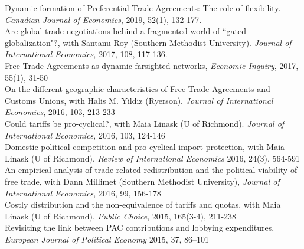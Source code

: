 \documentclass[11pt]{res}
\begin{document}
\begin{resume}
{Dynamic formation of Preferential Trade Agreements: The role of flexibility}. \emph{Canadian Journal of Economics}, 2019, 52(1), 132-177. \vspace{1.5mm}\\
{Are global trade negotiations behind a fragmented world of ``gated globalization"?}, with Santanu Roy (Southern Methodist University). \emph{Journal of International Economics}, 2017, 108, 117-136.\vspace{1.5mm}\\
{ Free Trade Agreements as dynamic farsighted networks}, \emph{Economic Inquiry}, 2017, 55(1), 31-50\vspace{1.5mm}\\
{On the different geographic characteristics of Free Trade Agreements and Customs Unions}, with Halis M. Yildiz (Ryerson). \emph{Journal of International Economics}, 2016, 103, 213-233 \vspace{1.5mm}\\
{Could tariffs be pro-cyclical?}, with Maia Linask (U of Richmond). \emph{Journal of International Economics}, 2016, 103, 124-146 \vspace{1.5mm}\\
{Domestic political competition and pro-cyclical import protection}, with Maia Linask (U of Richmond), \emph{Review of International Economics} 2016, 24(3), 564-591\vspace{1.5mm}\\
{An empirical analysis of trade-related redistribution and the political viability of free trade}, with Dann Millimet (Southern Methodist University), \emph{Journal of International Economics}, 2016, 99, 156-178 \vspace{1.5mm}\\
{Costly distribution and the non-equivalence of tariffs and quotas}, with Maia Linask (U of Richmond), \emph{Public Choice}, 2015, 165(3-4), 211-238 \vspace{1.5mm}\\
{Revisiting the link between PAC contributions and lobbying expenditures, \emph{European Journal of Political Economy}} 2015, 37, 86--101


\end{resume}
\end{document}

